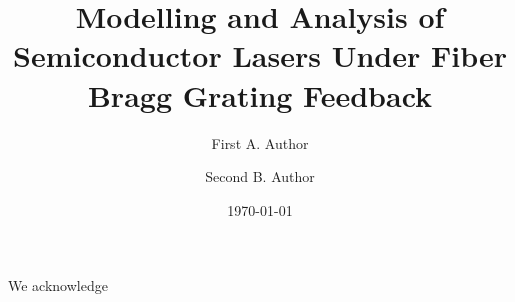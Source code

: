 \documentclass[
  reprint,            %
  amsmath,amssymb,    %
  aps,pre             %
]{revtex4-2}
\begin{document}

\title{Modelling and Analysis of Semiconductor Lasers Under Fiber Bragg Grating Feedback}

\author{First A. Author}
\author{Second B. Author}
\date{\today}





\maketitle





\begin{acknowledgments}
We acknowledge
\end{acknowledgments}

\appendix


\end{document}
